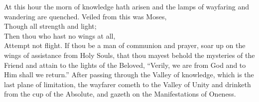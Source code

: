 \documentclass[12pt]{article}
\begin{document}
\vspace{2ex}
 {
At this hour the morn of knowledge hath arisen and the lamps of wayfaring and wandering are quenched.\footnotemark[24]
}
\vspace{2ex}
 {
Veiled from this was Moses, \\
Though all strength and light; \\
Then thou who hast no wings at all, \\
Attempt not flight.\footnotemark[16]
}
\vspace{2ex}
 {
If thou be a man of communion and prayer, soar up on the wings of assistance from Holy Souls,
}
\vspace{2ex}
 {
that thou mayest behold the mysteries of the Friend and attain to the lights of the Beloved, ``Verily, we are from God and to Him shall we return.''\footnotemark[25]
}
\vspace{2ex}
 {
After passing through the Valley of knowledge, which is the last plane of limitation, the wayfarer cometh to the Valley of Unity
}
\vspace{2ex}
 {
and drinketh from the cup of the Absolute, and gazeth on the Manifestations of Oneness.
}
\end{document}
